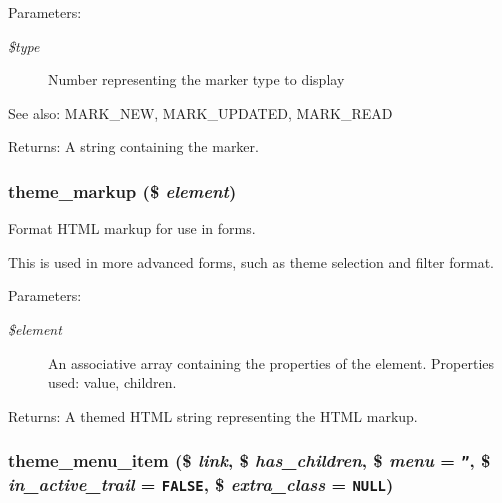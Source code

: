 \begin{Desc}
\item[Parameters:]
\begin{description}
\item[{\em \$type}]Number representing the marker type to display \end{description}
\end{Desc}
\begin{Desc}
\item[See also:]MARK\_\-NEW, MARK\_\-UPDATED, MARK\_\-READ \end{Desc}
\begin{Desc}
\item[Returns:]A string containing the marker. \end{Desc}
\hypertarget{group__themeable_gca9903e6eff98f89feffcea1fd144fc2}{
\subsubsection[{theme\_\-markup}]{\setlength{\rightskip}{0pt plus 5cm}theme\_\-markup (\$ {\em element})}}
\label{group__themeable_gca9903e6eff98f89feffcea1fd144fc2}


Format HTML markup for use in forms.

This is used in more advanced forms, such as theme selection and filter format.

\begin{Desc}
\item[Parameters:]
\begin{description}
\item[{\em \$element}]An associative array containing the properties of the element. Properties used: value, children. \end{description}
\end{Desc}
\begin{Desc}
\item[Returns:]A themed HTML string representing the HTML markup. \end{Desc}
\hypertarget{group__themeable_gcb681206cbcb99f33b633da5c9d843c2}{
\subsubsection[{theme\_\-menu\_\-item}]{\setlength{\rightskip}{0pt plus 5cm}theme\_\-menu\_\-item (\$ {\em link}, \/  \$ {\em has\_\-children}, \/  \$ {\em menu} = {\tt ''}, \/  \$ {\em in\_\-active\_\-trail} = {\tt FALSE}, \/  \$ {\em extra\_\-class} = {\tt NULL})}}
\label{group__themeable_gcb681206cbcb99f33b633da5c9d843c2}


